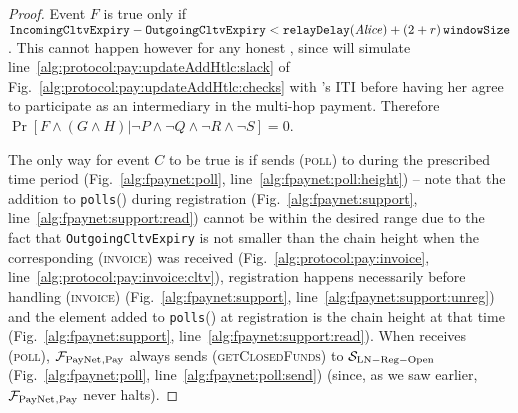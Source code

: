 \begin{proof}
  Event $F$ is true only if $\mathtt{IncomingCltvExpiry} -
  \mathtt{OutgoingCltvExpiry} < \mathtt{relayDelay}(\mathit{Alice}) + \left(2 + r\right)\texttt{windowSize}$. This
  cannot happen however for any honest \alice, since \simulator{} will simulate
  line~\ref{alg:protocol:pay:updateAddHtlc:slack} of
  Fig.~\ref{alg:protocol:pay:updateAddHtlc:checks} with \alice's ITI before
  having her agree to participate as an intermediary in the multi-hop payment.
  Therefore $\Pr[F \wedge (G \wedge H) | \neg P \wedge \neg Q \wedge \neg R
  \wedge \neg S] = 0$.

  The only way for event $C$ to be true is if \environment{} sends
  (\textsc{poll}) to \dave{} during the prescribed time period
  (Fig.~\ref{alg:fpaynet:poll}, line~\ref{alg:fpaynet:poll:height}) -- note that
  the addition to \texttt{polls}(\dave) during registration
  (Fig.~\ref{alg:fpaynet:support}, line~\ref{alg:fpaynet:support:read}) cannot
  be within the desired range due to the fact that \texttt{OutgoingCltvExpiry}
  is not smaller than the chain height when the corresponding (\textsc{invoice})
  was received (Fig.~\ref{alg:protocol:pay:invoice},
  line~\ref{alg:protocol:pay:invoice:cltv}), registration happens necessarily
  before handling (\textsc{invoice}) (Fig.~\ref{alg:fpaynet:support},
  line~\ref{alg:fpaynet:support:unreg}) and the element added to
  \texttt{polls}(\dave) at registration is the chain height at that time
  (Fig.~\ref{alg:fpaynet:support}, line~\ref{alg:fpaynet:support:read}). When
  \dave{} receives (\textsc{poll}), $\mathcal{F}_{\mathrm{PayNet}}{}_{\mathrm{, Pay}}$ always sends
  (\textsc{getClosedFunds}) to $\mathcal{S}_{\mathrm{LN - Reg - Open}}$
  (Fig.~\ref{alg:fpaynet:poll}, line~\ref{alg:fpaynet:poll:send}) (since, as we
  saw earlier, $\mathcal{F}_{\mathrm{PayNet}}{}_{\mathrm{, Pay}}$ never halts).


\end{proof}
